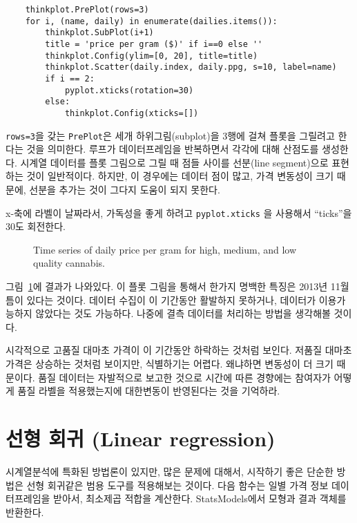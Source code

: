 \begin{verbatim}
    thinkplot.PrePlot(rows=3)
    for i, (name, daily) in enumerate(dailies.items()):
        thinkplot.SubPlot(i+1)
        title = 'price per gram ($)' if i==0 else ''
        thinkplot.Config(ylim=[0, 20], title=title)
        thinkplot.Scatter(daily.index, daily.ppg, s=10, label=name)
        if i == 2: 
            pyplot.xticks(rotation=30)
        else:
            thinkplot.Config(xticks=[])
\end{verbatim}

{\tt rows=3}을 갖는 {\tt PrePlot}은 세개 하위그림(subplot)을 3행에 걸쳐 플롯을 그릴려고 한다는 것을 의미한다.
루프가 데이터프레임을 반복하면서 각각에 대해 산점도를 생성한다.
시계열 데이터를 플롯 그림으로 그릴 때 점들 사이를 선분(line segment)으로 표현하는 것이 일반적이다. 하지만, 이 경우에는 데이터 점이 많고, 가격 변동성이 크기 때문에, 선분을 추가는 것이 그다지 도움이 되지 못한다.

x-축에 라벨이 날짜라서, 가독성을 좋게 하려고 {\tt pyplot.xticks} 을 사용해서 ``ticks''을 30도 회전한다.


\begin{figure}
\caption{Time series of daily price per gram for high, medium, and low
quality cannabis.}
\label{timeseries1}
\end{figure}

그림~\ref{timeseries1}에 결과가 나와있다.
이 플롯 그림을 통해서 한가지 명백한 특징은 2013년 11월 틈이 있다는 것이다.
데이터 수집이 이 기간동안 활발하지 못하거나, 데이터가 이용가능하지 않았다는 것도 가능하다. 나중에 결측 데이터를 처리하는 방법을 생각해볼 것이다.

시각적으로 고품질 대마초 가격이 이 기간동안 하락하는 것처럼 보인다. 저품질 대마초 가격은 상승하는 것처럼 보이지만, 식별하기는 어렵다. 왜냐하면 변동성이 더 크기 때문이다. 품질 데이터는 자발적으로 보고한 것으로 시간에 따른 경향에는 참여자가 어떻게 품질 라벨을 적용했는지에 대한변동이 반영된다는 것을 기억하라.


\section{선형 회귀 (Linear regression)}
\label{timeregress}

시계열분석에 특화된 방법론이 있지만, 많은 문제에 대해서, 시작하기 좋은 단순한 방법은 선형 회귀같은 범용 도구를 적용해보는 것이다.
다음 함수는 일별 가격 정보 데이터프레임을 받아서, 최소제곱 적합을 계산한다. StatsModels에서 모형과 결과 객체를 반환한다.

